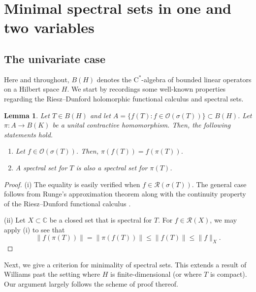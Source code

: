 \documentclass[10pt]{amsart}
\newcommand{\bC}{{\mathbb{C}}}
\renewcommand{\O}{{\mathcal{O}}}
\newcommand{\R}{{\mathcal{R}}}
\newcommand{\rC}{\mathrm{C}}
\newtheorem{lemma}{Lemma}[section]
\theoremstyle{definition}
\begin{document}
\section{Minimal spectral sets in one and two variables}\label{S:minspec}
\subsection{The univariate case}
Here and throughout, $B(H)$ denotes the $\rC^*$-algebra of bounded linear operators on a Hilbert space $H$. We start  by recordings some well-known properties regarding the Riesz--Dunford holomorphic functional calculus and spectral sets.

\begin{lemma}\label{L:homom}
Let $T\in B(H)$ and let $A=\{f(T):f\in \O(\sigma(T))\}\subset B(H)$. Let $\pi:A\to B(K)$ be a unital contractive homomorphism. Then, the following statements hold.
\begin{enumerate}[{\rm (i)}]
\item  Let $f\in\O(\sigma(T))$. Then, $\pi(f(T))=f(\pi(T))$.
\item A spectral set for $T$ is also a spectral set for $\pi(T)$.
\end{enumerate}
\end{lemma}
\begin{proof}
(i) The equality is easily verified when $f\in \R(\sigma(T))$. The general case follows from Runge's approximation theorem along with the continuity property of the Riesz--Dunford functional calculus \cite[Theorem I.37]{muller2007}.

(ii) Let $X\subset \bC$ be a closed set that is spectral for $T$. For $f\in \R(X)$, we may apply (i) to see that
\[
\|f(\pi(T))\|=\|\pi(f(T))\|\leq \|f(T)\|\leq \|f\|_X.
\]
\end{proof}

Next, we give a criterion for minimality of spectral sets. This extends a result of Williams \cite[Theorem 9]{williams1967} past the setting where $H$ is finite-dimensional (or where $T$ is compact). Our argument largely follows the scheme of  proof thereof.
\end{document}
